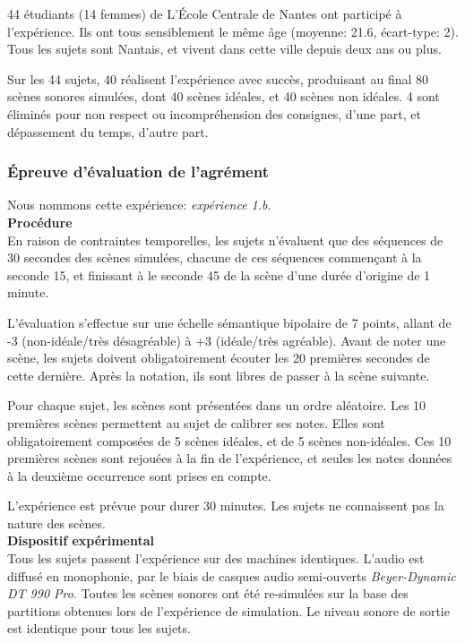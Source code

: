 44 étudiants (14 femmes) de L’École Centrale de Nantes ont participé à l'expérience. Ils ont tous sensiblement le même âge (moyenne: 21.6, écart-type: 2). Tous les sujets sont Nantais, et vivent dans cette ville depuis deux ans ou plus.

Sur les 44 sujets, 40 réalisent l'expérience avec succès, produisant au final 80 scènes sonores simulées, dont 40 scènes idéales, et 40 scènes non idéales. 4 sont éliminés pour non respect ou incompréhension des consignes, d'une part, et dépassement du temps, d'autre part.

\subsubsection{Épreuve d'évaluation de l'agrément}
\label{sec:ch5_planExpEvaA}

Nous nommons cette expérience: \emph{expérience 1.b}. \\

{\setlength{\parindent}{0cm}\textbf{Procédure}} \\

En raison de contraintes temporelles, les sujets n'évaluent que des séquences de 30 secondes des scènes simulées, chacune de ces séquences commençant à la seconde 15, et finissant à le seconde 45 de la scène d'une durée d'origine de 1 minute.

L'évaluation s'effectue sur une échelle sémantique bipolaire de 7 points, allant de -3 (non-idéale/très désagréable) à +3 (idéale/très agréable). Avant de noter une scène, les sujets doivent obligatoirement écouter les 20 premières secondes de cette dernière. Après la notation, ils sont libres de passer à la scène suivante.

Pour chaque sujet, les scènes sont présentées dans un ordre aléatoire. Les 10 premières scènes permettent au sujet de calibrer ses notes. Elles sont obligatoirement composées de 5 scènes idéales, et de 5 scènes non-idéales. Ces 10 premières scènes sont rejouées à la fin de l'expérience, et seules les notes données à la deuxième occurrence sont prises en compte. 

L'expérience est prévue pour durer 30 minutes. Les sujets ne connaissent pas la nature des scènes.\\

{\setlength{\parindent}{0cm}\textbf{Dispositif expérimental}} \\

Tous les sujets passent l'expérience sur des machines identiques. L'audio est diffusé en monophonie, par le biais de casques audio semi-ouverts \emph{Beyer-Dynamic DT 990 Pro}. Toutes les scènes sonores ont été re-simulées sur la base des partitions obtenues lors de l'expérience de simulation. Le niveau sonore de sortie est identique pour tous les sujets.

